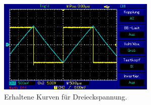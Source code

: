 \begin{figure}[H]
  \centering
  \includegraphics[height=4.5cm]{oz7.png}
  \caption{Erhaltene Kurven für Dreieckspannung.}
  \label{fig:s_s}
\end{figure}

